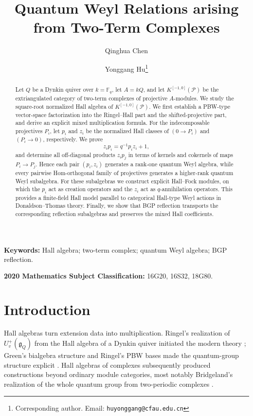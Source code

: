 \documentclass[12pt]{article}
\title{Quantum Weyl Relations arising from Two-Term Complexes}
\author[1]{Qinghua Chen
}
\author[2]{Yonggang Hu\thanks{Corresponding author. Email: \texttt{huyonggang@cfau.edu.cn}}}
\affil[1]{School of Mathematics and Statistics, Fuzhou University,
Fuzhou 350108, China}
\affil[2]{Department of International Economics, China Foreign Affairs University,
Beijing 100037, China}
\date{}
\newcommand{\cP}{\mathscr P}
\newcommand{\Ktwo}{K^{[-1,0]}}
\theoremstyle{plain}
\theoremstyle{remark}
\begin{document}
\maketitle

\begin{abstract}
Let $Q$ be a Dynkin quiver over $k=\mathbb F_q$, let $A=kQ$, and let
$\Ktwo(\cP)$ be the extriangulated category of two-term complexes of
projective $A$-modules. We study the square-root normalized Hall algebra of
$\Ktwo(\cP)$. We first establish a PBW-type vector-space factorization into
the Ringel--Hall part and the shifted-projective part, and derive an explicit
mixed multiplication formula. For the indecomposable projectives $P_i$, let
$p_i$ and $z_i$ be the normalized Hall classes of $(0\to P_i)$ and
$(P_i\to0)$, respectively. We prove
\[
 z_ip_i=q^{-1}p_iz_i+1,
\]
and determine all off-diagonal products $z_ip_j$ in terms of kernels and
cokernels of maps $P_i\to P_j$. Hence each pair $(p_i,z_i)$ generates a
rank-one quantum Weyl algebra, while every pairwise Hom-orthogonal family of
projectives generates a higher-rank quantum Weyl subalgebra. For these
subalgebras we construct explicit Hall--Fock modules, on which the $p_i$ act
as creation operators and the $z_i$ act as $q$-annihilation operators. This
provides a finite-field Hall model parallel to categorical Hall-type Weyl
actions in Donaldson--Thomas theory. Finally, we show that BGP reflection
transports the corresponding reflection subalgebras and preserves the mixed
Hall coefficients.
\end{abstract}

\noindent\textbf{Keywords:} Hall algebra; two-term complex; quantum Weyl algebra; BGP reflection.

\smallskip
\noindent\textbf{2020 Mathematics Subject Classification:} 16G20, 16S32, 18G80.

\section{Introduction}

Hall algebras turn extension data into multiplication. Ringel's realization
of $U_v^+(\mathfrak g_Q)$ from the Hall algebra of a Dynkin quiver initiated
the modern theory \cite{R90}; Green's bialgebra structure and Ringel's PBW
bases made the quantum-group structure explicit \cite{Gr95,R96}. Hall
algebras of complexes subsequently produced constructions beyond ordinary
module categories, most notably Bridgeland's realization of the whole
quantum group from two-periodic complexes \cite{B13}.
\end{document}

